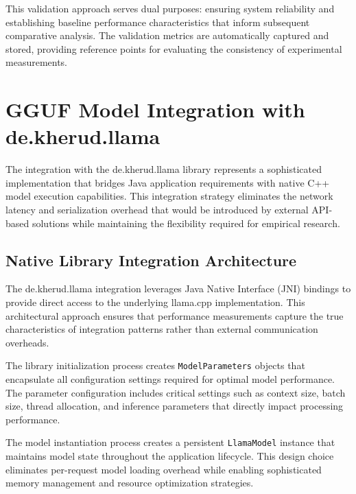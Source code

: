 This validation approach serves dual purposes: ensuring system reliability and establishing baseline performance characteristics that inform subsequent comparative analysis. The validation metrics are automatically captured and stored, providing reference points for evaluating the consistency of experimental measurements.


\section{GGUF Model Integration with de.kherud.llama}

The integration with the de.kherud.llama library represents a sophisticated implementation that bridges Java application requirements with native C++ model execution capabilities. This integration strategy eliminates the network latency and serialization overhead that would be introduced by external API-based solutions while maintaining the flexibility required for empirical research.

\subsection{Native Library Integration Architecture}

The de.kherud.llama integration leverages Java Native Interface (JNI) bindings to provide direct access to the underlying llama.cpp implementation. This architectural approach ensures that performance measurements capture the true characteristics of integration patterns rather than external communication overheads.

The library initialization process creates \texttt{ModelParameters} objects that encapsulate all configuration settings required for optimal model performance. The parameter configuration includes critical settings such as context size, batch size, thread allocation, and inference parameters that directly impact processing performance.


The model instantiation process creates a persistent \texttt{LlamaModel} instance that maintains model state throughout the application lifecycle. This design choice eliminates per-request model loading overhead while enabling sophisticated memory management and resource optimization strategies.

